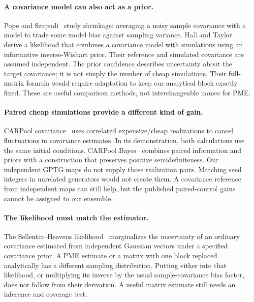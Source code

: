 \documentclass[11pt]{article}
\begin{document}
\paragraph{A covariance model can also act as a prior.}
Pope and Szapudi~\cite{shrinkage} study shrinkage: averaging a noisy sample
covariance with a model to trade some model bias against sampling variance.
Hall and Taylor~\cite{halltaylor} derive a likelihood that combines a
covariance model with simulations using an informative inverse-Wishart
prior. Their reference and simulated covariance are assumed independent.
The prior confidence describes uncertainty about the target covariance;
it is not simply the number of cheap simulations. Their full-matrix
formula would require adaptation to keep our analytical block exactly
fixed. These are useful comparison methods, not interchangeable names
for PME.

\paragraph{Paired cheap simulations provide a different kind of gain.}
CARPool covariance~\cite{carpool} uses correlated expensive/cheap
realizations to cancel fluctuations in covariance estimates. In its
demonstration, both calculations use the same initial conditions.
CARPool Bayes~\cite{carpoolbayes} combines paired information and priors
with a construction that preserves positive semidefiniteness. Our
independent GPTG maps do not supply those realization pairs. Matching seed
integers in unrelated generators would not create them. A covariance
reference from independent maps can still help, but the published
paired-control gains cannot be assigned to our ensemble.

\paragraph{The likelihood must match the estimator.}
The Sellentin--Heavens likelihood~\cite{sellentin} marginalizes the
uncertainty of an ordinary covariance estimated from independent Gaussian
vectors under a specified covariance prior. A PME estimate or a matrix
with one block replaced analytically has a different sampling distribution.
Putting either into that likelihood, or multiplying its inverse by the
usual sample-covariance bias factor, does not follow from their derivation.
A useful matrix estimate still needs an inference and coverage test.
\end{document}
